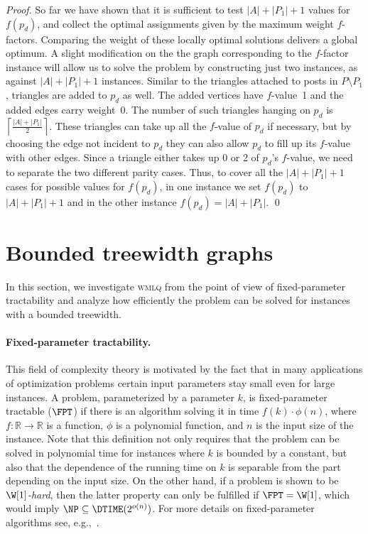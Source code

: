 \documentclass{llncs}
\begin{document}
\begin{proof}
So far we have shown that it is sufficient to test  $|A| + |P_1| +1$ values for $f(p_d)$, and collect the optimal assignments given by the maximum weight $f$-factors. Comparing the weight of these locally optimal solutions delivers a global optimum. A slight modification on the the graph corresponding to the $f$-factor instance will allow us to solve the problem by constructing just two instances, as against $|A| + |P_1| +1$ instances. Similar to the triangles attached to posts in $P \setminus P_1$, triangles are added to $p_d$ as well. The added vertices have $f$-value~1 and the added edges carry weight~0. The number of such triangles hanging on $p_d$ is~$\left\lceil\frac{|A| + |P_1|}{2}\right\rceil$. These triangles can take up all the $f$-value of $p_d$ if necessary, but by choosing the edge not incident to $p_d$ they can also allow $p_d$ to fill up its $f$-value with other edges. Since a triangle either takes up 0 or 2 of $p_d$'s $f$-value, we need to separate the two different parity cases. Thus, to cover all the $|A| + |P_1| + 1$ cases for possible values for $f(p_d)$, in one instance we set $f(p_d)$ to $|A| + |P_1| + 1$ and in the other instance $f(p_d) = |A| + |P_1|$.
\qed
\end{proof}











\section{Bounded treewidth graphs}
\label{sec:bounded_tw}

In this section, we investigate \textsc{wmlq} from the point of view of fixed-parameter tractability and analyze how efficiently the problem can be solved for instances with a bounded treewidth.

\paragraph{Fixed-parameter tractability.}
This field of complexity theory is motivated by the fact that in many applications of optimization problems certain input parameters stay small even for large instances. 
A problem, parameterized by a parameter $k$, is fixed-parameter tractable ($\FPT$) if there is an algorithm solving it in time $f(k)\cdot \phi(n)$, where $f : \mathbb{R} \rightarrow \mathbb{R}$ is a function, $\phi$ is a polynomial function, and $n$ is the input size of the instance. Note that this definition not only requires that the problem can be solved in polynomial time for instances where $k$ is bounded by a constant, but also that the dependence of the running time on $k$ is separable from the part depending on the input size. On the other hand, if a problem is shown to be \emph{$\W[1]$-hard}, then the latter property can only be fulfilled if $\FPT = \W[1]$, which would imply $\NP \subseteq \DTIME(2^{o(n)})$. For more details on fixed-parameter algorithms see, e.g.,~\cite{Nie06}.
\end{document}
